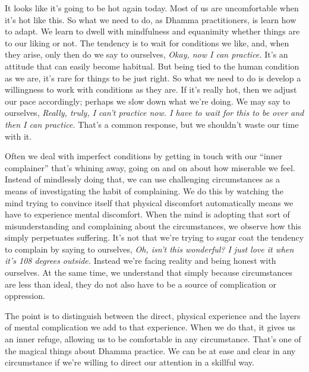 
It looks like it's going to be hot again today. Most of us are 
uncomfortable when it's hot like this. So what we need to do, as Dhamma 
practitioners, is learn how to adapt. We learn to dwell with 
mindfulness and equanimity whether things are to our liking or not. The 
tendency is to wait for conditions we like, and, when they arise, only 
then do we say to ourselves, \emph{Okay, now I can practice.} It's an 
attitude that can easily become habitual. But being tied to the human 
condition as we are, it's rare for things to be just right. So what we 
need to do is develop a willingness to work with conditions as they 
are. If it's really hot, then we adjust our pace accordingly; perhaps 
we slow down what we're doing. We may say to ourselves, \emph{Really, 
truly, I can't practice now. I have to wait for this to be over and 
then I can practice.} That's a common response, but we shouldn't waste 
our time with it.

Often we deal with imperfect conditions by getting in touch with our 
``inner complainer'' that's whining away, going on and on about how 
miserable we feel. Instead of mindlessly doing that, we can use 
challenging circumstances as a means of investigating the habit of 
complaining. We do this by watching the mind trying to convince itself 
that physical discomfort automatically means we have to experience 
mental discomfort. When the mind is adopting that sort of 
misunderstanding and complaining about the circumstances, we observe 
how this simply perpetuates suffering. It's not that we're trying to 
sugar coat the tendency to complain by saying to ourselves, \emph{Oh, 
isn't this wonderful? I just love it when it's 108 degrees outside.} 
Instead we're facing reality and being honest with ourselves. At the 
same time, we understand that simply because circumstances are less 
than ideal, they do not also have to be a source of complication or 
oppression.

The point is to distinguish between the direct, physical experience and 
the layers of mental complication we add to that experience. When we do 
that, it gives us an inner refuge, allowing us to be comfortable in any 
circumstance. That's one of the magical things about Dhamma practice. 
We can be at ease and clear in any circumstance if we're willing to 
direct our attention in a skillful way.

